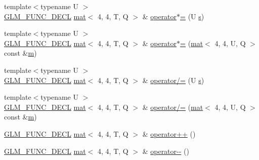 \begin{DoxyCompactItemize}
\item 
{\footnotesize template$<$typename U $>$ }\\\mbox{\hyperlink{setup_8hpp_ab2d052de21a70539923e9bcbf6e83a51}{G\+L\+M\+\_\+\+F\+U\+N\+C\+\_\+\+D\+E\+CL}} \mbox{\hyperlink{structglm_1_1mat}{mat}}$<$ 4, 4, T, Q $>$ \& \mbox{\hyperlink{structglm_1_1mat_3_014_00_014_00_01_t_00_01_q_01_4_a431d493d66da8eeb6f7b94f97e40f420}{operator$\ast$=}} (U \mbox{\hyperlink{_s_d_l__opengl_8h_a4af680a6c683f88ed67b76f207f2e6e4}{s}})
\item 
{\footnotesize template$<$typename U $>$ }\\\mbox{\hyperlink{setup_8hpp_ab2d052de21a70539923e9bcbf6e83a51}{G\+L\+M\+\_\+\+F\+U\+N\+C\+\_\+\+D\+E\+CL}} \mbox{\hyperlink{structglm_1_1mat}{mat}}$<$ 4, 4, T, Q $>$ \& \mbox{\hyperlink{structglm_1_1mat_3_014_00_014_00_01_t_00_01_q_01_4_a2b2e2159f3d8ae83016b90f092a3be1f}{operator$\ast$=}} (\mbox{\hyperlink{structglm_1_1mat}{mat}}$<$ 4, 4, U, Q $>$ const \&\mbox{\hyperlink{_s_d_l__opengl__glext_8h_af593500c283bf1a787a6f947f503a5c2}{m}})
\item 
{\footnotesize template$<$typename U $>$ }\\\mbox{\hyperlink{setup_8hpp_ab2d052de21a70539923e9bcbf6e83a51}{G\+L\+M\+\_\+\+F\+U\+N\+C\+\_\+\+D\+E\+CL}} \mbox{\hyperlink{structglm_1_1mat}{mat}}$<$ 4, 4, T, Q $>$ \& \mbox{\hyperlink{structglm_1_1mat_3_014_00_014_00_01_t_00_01_q_01_4_a518f7ffaaea8e439f279bf319977b9ca}{operator/=}} (U \mbox{\hyperlink{_s_d_l__opengl_8h_a4af680a6c683f88ed67b76f207f2e6e4}{s}})
\item 
{\footnotesize template$<$typename U $>$ }\\\mbox{\hyperlink{setup_8hpp_ab2d052de21a70539923e9bcbf6e83a51}{G\+L\+M\+\_\+\+F\+U\+N\+C\+\_\+\+D\+E\+CL}} \mbox{\hyperlink{structglm_1_1mat}{mat}}$<$ 4, 4, T, Q $>$ \& \mbox{\hyperlink{structglm_1_1mat_3_014_00_014_00_01_t_00_01_q_01_4_ad786f3d74c405ba7fb25905a8c0e1705}{operator/=}} (\mbox{\hyperlink{structglm_1_1mat}{mat}}$<$ 4, 4, U, Q $>$ const \&\mbox{\hyperlink{_s_d_l__opengl__glext_8h_af593500c283bf1a787a6f947f503a5c2}{m}})
\item 
\mbox{\hyperlink{setup_8hpp_ab2d052de21a70539923e9bcbf6e83a51}{G\+L\+M\+\_\+\+F\+U\+N\+C\+\_\+\+D\+E\+CL}} \mbox{\hyperlink{structglm_1_1mat}{mat}}$<$ 4, 4, T, Q $>$ \& \mbox{\hyperlink{structglm_1_1mat_3_014_00_014_00_01_t_00_01_q_01_4_a39435dc193ef8ac3a8c417651ae6440e}{operator++}} ()
\item 
\mbox{\hyperlink{setup_8hpp_ab2d052de21a70539923e9bcbf6e83a51}{G\+L\+M\+\_\+\+F\+U\+N\+C\+\_\+\+D\+E\+CL}} \mbox{\hyperlink{structglm_1_1mat}{mat}}$<$ 4, 4, T, Q $>$ \& \mbox{\hyperlink{structglm_1_1mat_3_014_00_014_00_01_t_00_01_q_01_4_a3c62ee9d03614c428b3e7d81dac27f8c}{operator-\/-\/}} ()

\end{DoxyCompactItemize}
